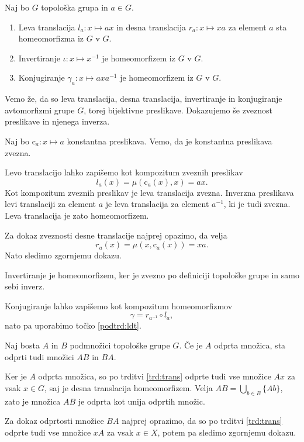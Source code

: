 \documentclass[mat1]{fmfdelo}
\begin{document}
\begin{trditev}\label{trd:trans}
Naj bo $G$ topološka grupa in $a \in G$.
\begin{enumerate}
\item Leva translacija $l_a\colon x \mapsto ax$ in desna translacija $r_a\colon x \mapsto xa$ za element $a$ sta homeomorfizma iz $G$ v $G$.\label{podtrd:ldt}
\item Invertiranje $\iota\colon x \mapsto x^{-1}$ je homeomorfizem iz $G$ v $G$.
\item Konjugiranje $\gamma_a\colon x \mapsto axa^{-1}$ je homeomorfizem iz $G$ v $G$.
\end{enumerate}
\end{trditev}

\begin{dokaz}
Vemo že, da so leva translacija, desna translacija, invertiranje in konjugiranje avtomorfizmi grupe $G$, torej bijektivne preslikave. Dokazujemo še zveznost pre\-sli\-ka\-ve in njenega inverza.

Naj bo $\text{c}_a\colon x \mapsto a$ konstantna preslikava. Vemo, da je konstantna preslikava zvezna.

Levo translacijo lahko zapišemo kot kompozitum zveznih preslikav \[l_a(x) = \mu(\text{c}_a(x), x) = ax.\]
Kot kompozitum zveznih preslikav je leva translacija zvezna. Inverzna preslikava levi translaciji za element $a$ je leva translacija za element $a^{-1}$, ki je tudi zvezna. Leva translacija je zato homeomorfizem.

Za dokaz zveznosti desne translacije najprej opazimo, da velja
\[r_a(x) = \mu(x, \text{c}_a(x)) = xa.\]
Nato sledimo zgornjemu dokazu.

Invertiranje je homeomorfizem, ker je zvezno po definiciji topološke grupe in samo sebi inverz.

Konjugiranje lahko zapišemo kot kompozitum homeomorfizmov \[\gamma = r_{a^{-1}} \circ l_a,\]
nato pa uporabimo točko \ref{podtrd:ldt}.
\end{dokaz}

\begin{trditev}\label{trd:prododp}
Naj bosta $A$ in $B$ podmnožici topološke grupe $G$. Če je $A$ odprta množica, sta odprti tudi množici $AB$ in $BA$.
\end{trditev}

\begin{dokaz}
Ker je $A$ odprta množica, so po trditvi \ref{trd:trans} odprte tudi vse množice $Ax$ za vsak $x \in G$, saj je desna translacija homeomorfizem. Velja $AB = \bigcup_{b \in B}\lbrace Ab\rbrace$, zato je množica $AB$ je odprta kot unija odprtih množic.

Za dokaz odprtosti množice $BA$ najprej oprazimo, da so po trditvi \ref{trd:trans} odprte tudi vse množice $xA$ za vsak $x \in X$, potem pa sledimo zgornjemu dokazu.
\end{dokaz}
\end{document}
